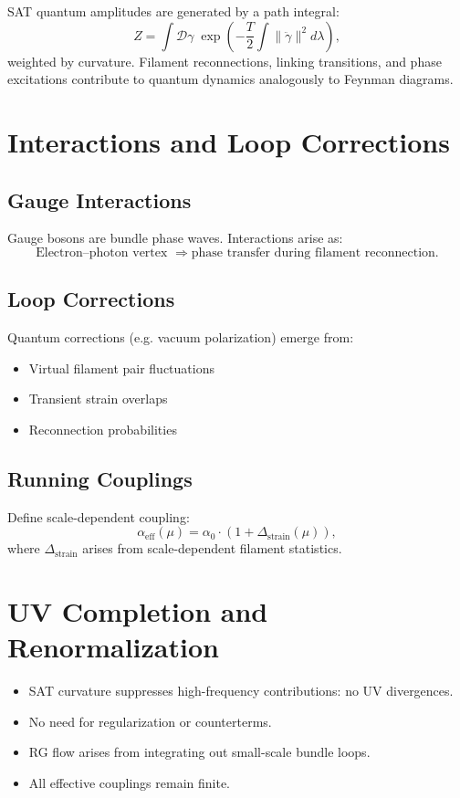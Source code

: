 \documentclass[11pt]{article}
\begin{document}
SAT quantum amplitudes are generated by a path integral:
\[
Z = \int \mathcal{D}\gamma\; \exp\left( -\frac{T}{2} \int \|\ddot\gamma\|^2 d\lambda \right),
\]
weighted by curvature. Filament reconnections, linking transitions, and phase excitations contribute to quantum dynamics analogously to Feynman diagrams.

\section{Interactions and Loop Corrections}

\subsection{Gauge Interactions}
Gauge bosons are bundle phase waves. Interactions arise as:
\[
\text{Electron--photon vertex } \Rightarrow \text{phase transfer during filament reconnection}.
\]

\subsection{Loop Corrections}
Quantum corrections (e.g. vacuum polarization) emerge from:
\begin{itemize}
  \item Virtual filament pair fluctuations
  \item Transient strain overlaps
  \item Reconnection probabilities
\end{itemize}

\subsection{Running Couplings}
Define scale-dependent coupling:
\[
\alpha_{\text{eff}}(\mu) = \alpha_0 \cdot (1 + \Delta_{\text{strain}}(\mu)),
\]
where \( \Delta_{\text{strain}} \) arises from scale-dependent filament statistics.

\section{UV Completion and Renormalization}

\begin{itemize}
  \item SAT curvature suppresses high-frequency contributions: no UV divergences.
  \item No need for regularization or counterterms.
  \item RG flow arises from integrating out small-scale bundle loops.
  \item All effective couplings remain finite.
\end{itemize}
\end{document}
